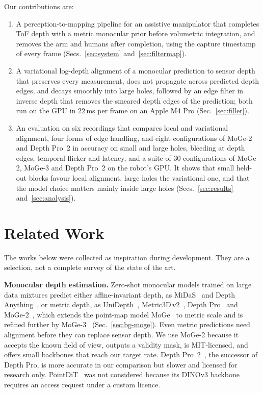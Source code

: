 \documentclass[conference]{IEEEtran}
\begin{document}
Our contributions are:
\begin{enumerate}
  \item A perception-to-mapping pipeline for an assistive
        manipulator that completes ToF depth with a metric monocular prior
        before volumetric integration, and removes the arm and humans after
        completion, using the capture timestamp of every frame
        (Secs.~\ref{sec:system} and~\ref{sec:filtermap}).
  \item A variational log-depth alignment of a monocular prediction to sensor
        depth that preserves every measurement, does not propagate across
        predicted depth edges, and decays smoothly into large holes, followed
        by an edge filter in inverse depth that removes the smeared depth
        edges of the prediction; both run on the GPU in \(22\,\)ms per frame on
        an Apple M4 Pro (Sec.~\ref{sec:filler}).
  \item An evaluation on six recordings that compares local and variational
        alignment, four forms of edge handling, and eight configurations of
        MoGe-2 and Depth Pro~2 in accuracy on small and large holes, bleeding
        at depth edges, temporal flicker and latency, and a suite of \(30\)
        configurations of MoGe-2, MoGe-3 and Depth Pro~2 on the robot's GPU. It shows that small
        held-out blocks favour local alignment, large holes the variational
        one, and that the model choice matters mainly inside large holes
        (Secs.~\ref{sec:results} and~\ref{sec:analysis}).
\end{enumerate}

\section{Related Work}
\label{sec:related}

The works below were collected as inspiration during development. They are a
selection, not a complete survey of the state of the art.

\textbf{Monocular depth estimation.}
Zero-shot monocular models trained on large data mixtures predict either
affine-invariant depth, as MiDaS~\cite{ranftl2020midas} and Depth
Anything~\cite{yang2024depthanything,yang2024depthanythingv2}, or metric
depth, as UniDepth~\cite{piccinelli2024unidepth},
Metric3D\,v2~\cite{hu2024metric3dv2}, Depth
Pro~\cite{bochkovskii2025depthpro} and MoGe-2~\cite{wang2025moge2}, which
extends the point-map model MoGe~\cite{wang2025moge} to metric scale and is
refined further by MoGe-3~\cite{kong2026moge3} (Sec.~\ref{sec:bg-moge}). Even
metric predictions need alignment before they can replace sensor depth. We use
MoGe-2 because it accepts the known field of view, outputs a validity mask, is
MIT-licensed, and offers small backbones that reach our target rate. Depth
Pro~2~\cite{hu2026depthpro2}, the successor of Depth Pro, is more accurate in our
comparison but slower and licensed for research only. PointDiT~\cite{xu2026pointdit}
was not considered because its DINOv3 backbone~\cite{simeoni2025dinov3}
requires an access request under a custom licence.
\end{document}
